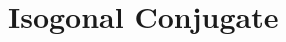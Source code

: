 \documentclass[../../../main.tex]{subfiles}
\begin{document}
\section{Isogonal Conjugate}
\end{document}
